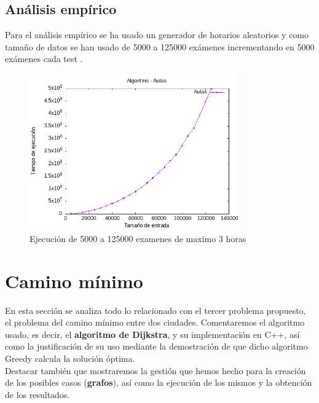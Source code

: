 \documentclass[11pt,openany]{book}
\begin{document}
\section{Análisis empírico}
Para el análisis empírico se ha usado un generador de horarios 
aleatorios y como tamaño de datos se han usado de 5000 a 125000
exámenes incrementando en 5000 exámenes cada test .

\begin{figure}[H]
      \centering
      \includegraphics[width=0.8\textwidth]{assets/Img/Aulas.png}
      \caption{Ejecución de 5000 a 125000 examenes de maximo 3 horas}
\end{figure}


\chapter{Camino mínimo} %
En esta sección se analiza todo lo relacionado con el tercer problema propuesto, el problema del camino mínimo entre dos ciudades. 
Comentaremos el algoritmo usado, es decir, el \textbf{algoritmo de Dijkstra}, y su implementación en C++, así como la justificación de su uso mediante
la demostración de que dicho algoritmo Greedy calcula la solución óptima.  \\
Destacar también que mostraremos la gestión que hemos hecho para la creación de los posibles casos (\textbf{grafos}), así como la 
ejecución de los mismos y la obtención de los resultados.
\end{document}
